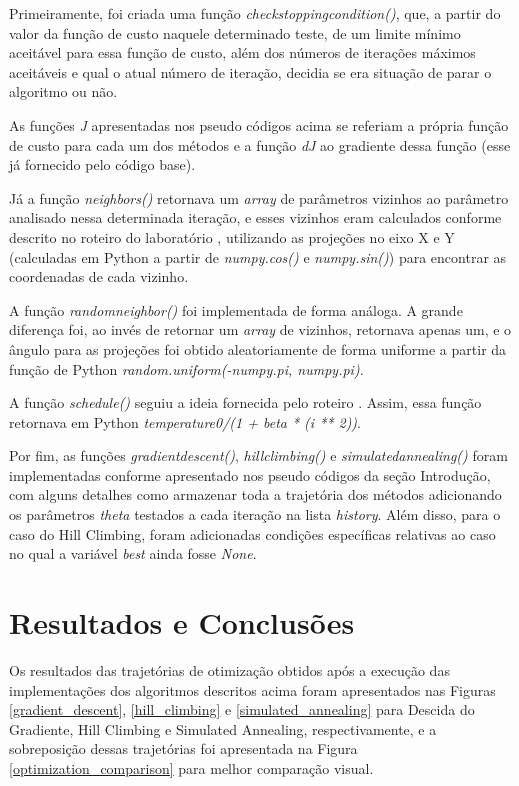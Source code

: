 \documentclass[conference]{IEEEtran}
\begin{document}
Primeiramente, foi criada uma função \textit{check\underline{\space}stopping\underline{\space}condition()}, que, a partir do valor da função de custo naquele determinado teste, de um limite mínimo aceitável para essa função de custo, além dos números de iterações máximos aceitáveis e qual o atual número de iteração, decidia se era situação de parar o algoritmo ou não.

As funções \textit{J} apresentadas nos pseudo códigos acima se referiam a própria função de custo para cada um dos métodos e a função \textit{dJ} ao gradiente dessa função (esse já fornecido pelo código base).

Já a função \textit{neighbors()} retornava um \textit{array} de parâmetros vizinhos ao parâmetro analisado nessa determinada iteração, e esses vizinhos eram calculados conforme descrito no roteiro do laboratório \cite{b1}, utilizando as projeções no eixo X e Y (calculadas em Python a partir de \textit{numpy.cos()} e \textit{numpy.sin()}) para encontrar as coordenadas de cada vizinho.

A função \textit{random\underline{\space}neighbor()} foi implementada de forma análoga. A grande diferença foi, ao invés de retornar um \textit{array} de vizinhos, retornava apenas um, e o ângulo para as projeções foi obtido aleatoriamente de forma uniforme a partir da função de Python \textit{random.uniform(-numpy.pi, numpy.pi)}.

A função \textit{schedule()} seguiu a ideia fornecida pelo roteiro \cite{b1}. Assim, essa função retornava em Python \textit{temperature0/(1 + beta * (i ** 2))}.

Por fim, as funções \textit{gradient\underline{\space}descent()}, \textit{hill\underline{\space}climbing()} e \textit{simulated\underline{\space}annealing()} foram implementadas conforme apresentado nos pseudo códigos da seção Introdução, com alguns detalhes como armazenar toda a trajetória dos métodos adicionando os parâmetros \textit{theta} testados a cada iteração na lista \textit{history}. Além disso, para o caso do Hill Climbing, foram adicionadas condições específicas relativas ao caso no qual a variável \textit{best} ainda fosse \textit{None}. 

\section{Resultados e Conclusões}
Os resultados das trajetórias de otimização obtidos após a execução das implementações dos algoritmos descritos acima foram apresentados nas Figuras \ref{gradient_descent}, \ref{hill_climbing} e \ref{simulated_annealing} para Descida do Gradiente, Hill Climbing e Simulated Annealing, respectivamente, e a sobreposição dessas trajetórias foi apresentada na Figura \ref{optimization_comparison} para melhor comparação visual.
\end{document}
